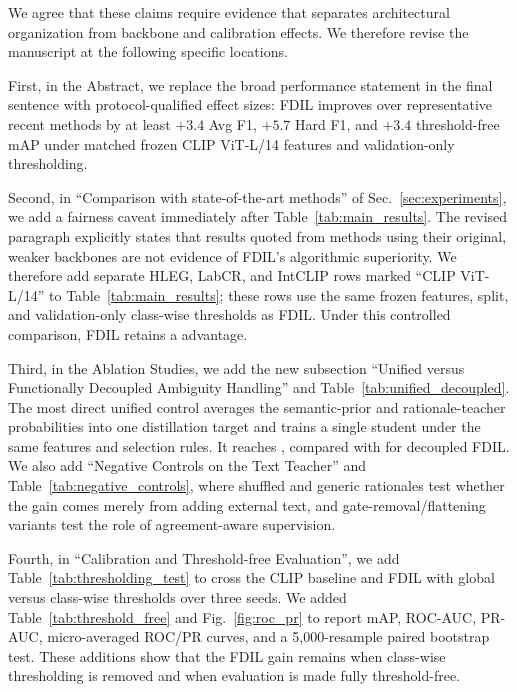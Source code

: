 {We agree that these claims require evidence that separates architectural organization from backbone and calibration effects. We therefore revise the manuscript at the following specific locations.

First, in the Abstract, we replace the broad performance statement in the final sentence with protocol-qualified effect sizes: FDIL improves over representative recent methods by at least $+3.4$ Avg F1, $+5.7$ Hard F1, and $+3.4$ threshold-free mAP under matched frozen CLIP ViT-L/14 features and validation-only thresholding.

Second, in ``Comparison with state-of-the-art methods'' of Sec.~\ref{sec:experiments}, we add a fairness caveat immediately after Table~\ref{tab:main_results}. The revised paragraph explicitly states that results quoted from methods using their original, weaker backbones are not evidence of FDIL's algorithmic superiority. We therefore add separate HLEG, LabCR, and IntCLIP rows marked ``CLIP ViT-L/14'' to Table~\ref{tab:main_results}; these rows use the same frozen features, split, and validation-only class-wise thresholds as FDIL. Under this controlled comparison, FDIL retains a  advantage.

Third, in the Ablation Studies, we add the new subsection ``Unified versus Functionally Decoupled Ambiguity Handling'' and Table~\ref{tab:unified_decoupled}. The most direct unified control averages the semantic-prior and rationale-teacher probabilities into one distillation target and trains a single student under the same features and selection rules. It reaches , compared with  for decoupled FDIL. We also add ``Negative Controls on the Text Teacher'' and Table~\ref{tab:negative_controls}, where shuffled and generic rationales test whether the gain comes merely from adding external text, and gate-removal/flattening variants test the role of agreement-aware supervision.

Fourth, in ``Calibration and Threshold-free Evaluation'', we add Table~\ref{tab:thresholding_test} to cross the CLIP baseline and FDIL with global versus class-wise thresholds over three seeds. We added Table~\ref{tab:threshold_free} and Fig.~\ref{fig:roc_pr} to report mAP, ROC-AUC, PR-AUC, micro-averaged ROC/PR curves, and a 5,000-resample paired bootstrap test. These additions show that the FDIL gain remains when class-wise thresholding is removed and when evaluation is made fully threshold-free.

}
